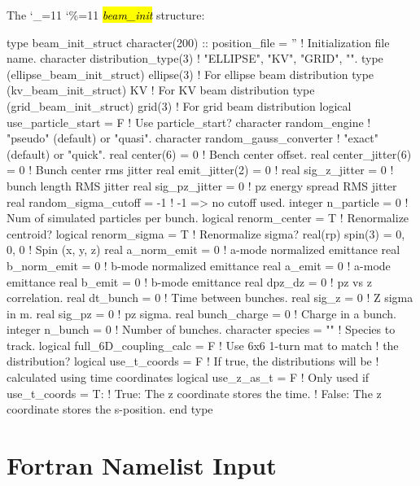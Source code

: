 \documentclass{hitec}
\newcommand\dottcmd[1]{\hl{\em#1}\endgroup}
\newcommand{\vn}{\begingroup\catcode`\_=11 \catcode`\%=11 \dottcmd}
\newcommand{\Section}[1]{\section{#1}\vspace*{-1ex}}
\begin{document}
{{{{{{{{{{{{\begin{code}
{{{{{{{{{{{The \vn{beam_init} structure:
\begin{code}
type beam_init_struct
  character(200) :: position_file = ''       ! Initialization file name.
  character distribution_type(3)             ! "ELLIPSE", "KV", "GRID", "".
  type (ellipse_beam_init_struct) ellipse(3) ! For ellipse beam distribution
  type (kv_beam_init_struct) KV              ! For KV beam distribution
  type (grid_beam_init_struct) grid(3)       ! For grid beam distribution
  logical use_particle_start = F     ! Use particle_start?
  character random_engine            ! "pseudo" (default) or "quasi". 
  character random_gauss_converter   ! "exact" (default) or "quick". 
  real center(6) = 0                 ! Bench center offset.
  real center_jitter(6) = 0          ! Bunch center rms jitter
  real emit_jitter(2)   = 0          ! %
  real sig_z_jitter     = 0          ! bunch length RMS jitter 
  real sig_pz_jitter     = 0         ! pz energy spread RMS jitter 
  real random_sigma_cutoff = -1      ! -1 => no cutoff used.
  integer n_particle = 0             ! Num of simulated particles per bunch.
  logical renorm_center = T          ! Renormalize centroid?
  logical renorm_sigma = T           ! Renormalize sigma?
  real(rp) spin(3) = 0, 0, 0         ! Spin (x, y, z)
  real a_norm_emit = 0               ! a-mode normalized emittance
  real b_norm_emit = 0               ! b-mode normalized emittance
  real a_emit = 0                    ! a-mode emittance
  real b_emit = 0                    ! b-mode emittance
  real dpz_dz = 0                    ! pz vs z correlation.
  real dt_bunch = 0                  ! Time between bunches.
  real sig_z = 0                     ! Z sigma in m.
  real sig_pz = 0                    ! pz sigma.
  real bunch_charge = 0              ! Charge in a bunch.
  integer n_bunch = 0                ! Number of bunches.
  character species = ""             ! Species to track.
  logical full_6D_coupling_calc = F  ! Use 6x6 1-turn mat to match 
                                     !              the distribution?  
  logical use_t_coords = F  ! If true, the distributions will be 
                            !   calculated using time coordinates
  logical use_z_as_t   = F  ! Only used if use_t_coords = T:
                            !   True:  The z coordinate stores the time.
                            !   False: The z coordinate stores the s-position.
end type
\end{code}

\Section{Fortran Namelist Input}
\label{s:namelist}

}}}}}}}}}}}
\end{code}}}}}}}}}}}}}
\end{document}

